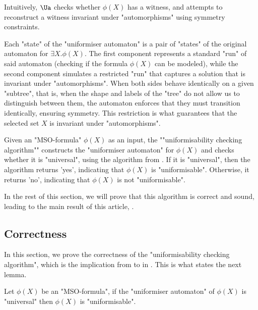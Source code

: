 \documentclass[a4paper,UKenglish,cleveref, autoref, thm-restate]{lipics-v2021}
\begin{document}
Intuitively, $\Ua$ checks whether $\phi(X)$ has a witness, and attempts to reconstruct a witness invariant under "automorphisms" using symmetry constraints.

Each "state" of the "uniformiser automaton" is a pair of "states" of the original automaton for $\exists X.\phi(X)$.
The first component represents a standard "run" of said automaton (checking if the formula $\phi(X)$
can be modeled), while the second component simulates a restricted "run" that captures a solution that is invariant under "automorphisms".
When both sides behave identically on a given "subtree", that is, when the shape and labels of the "tree" do not allow
us to distinguish between them, the automaton enforces that they must transition identically, ensuring symmetry. This restriction
is what guarantees that the selected set $X$ is invariant under "automorphisms".

\begin{definition}
	\AP Given an "MSO-formula" $\phi(X)$ as an input, the ""uniformisability checking algorithm"" constructs the "uniformiser automaton" for $\phi(X)$
	and checks whether it is "universal", using the algorithm from . If it is "universal", then the algorithm returns 'yes', indicating
	that $\phi(X)$ is "uniformisable". Otherwise, it returns 'no', indicating that $\phi(X)$ is not "uniformisable".
\end{definition}

In the rest of this section, we will prove that this algorithm is correct and sound, leading to the main result of this article, .

\subsection{Correctness}\label{section:correctness}

In this section, we prove the correctness of the "uniformisability checking algorithm", which is the
implication from  to   in .
This is what states the next lemma.

\begin{lemma}\label{lemma:universal-implies-uniformisable}
	Let $\phi(X)$ be an "MSO-formula", if the "uniformiser automaton" of $\phi(X)$ is "universal" then $\phi(X)$ is "uniformisable".
\end{lemma}
\end{document}

